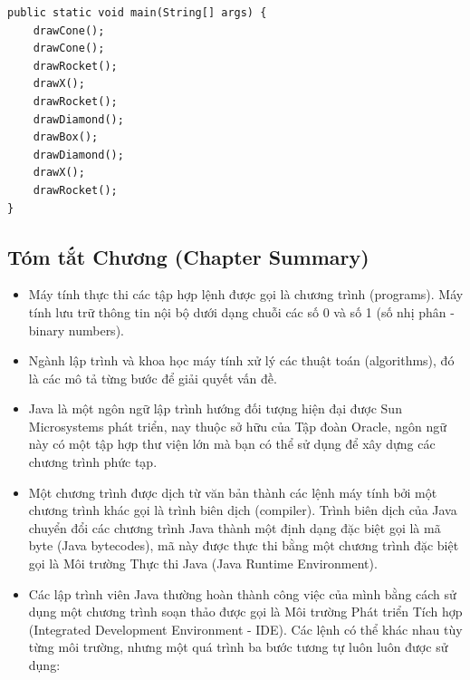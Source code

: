 \begin{verbatim}
public static void main(String[] args) {
    drawCone();
    drawCone();
    drawRocket();
    drawX();
    drawRocket();
    drawDiamond();
    drawBox();
    drawDiamond();
    drawX();
    drawRocket();
}
\end{verbatim}

\subsection{Tóm tắt Chương (Chapter
Summary)}\label{tuxf3m-tux1eaft-chux1b0ux1a1ng-chapter-summary}

\begin{itemize}
\tightlist
\item
  Máy tính thực thi các tập hợp lệnh được gọi là chương trình
  (programs). Máy tính lưu trữ thông tin nội bộ dưới dạng chuỗi các số 0
  và số 1 (số nhị phân - binary numbers).
\item
  Ngành lập trình và khoa học máy tính xử lý các thuật toán
  (algorithms), đó là các mô tả từng bước để giải quyết vấn đề.
\item
  Java là một ngôn ngữ lập trình hướng đối tượng hiện đại được Sun
  Microsystems phát triển, nay thuộc sở hữu của Tập đoàn Oracle, ngôn
  ngữ này có một tập hợp thư viện lớn mà bạn có thể sử dụng để xây dựng
  các chương trình phức tạp.
\item
  Một chương trình được dịch từ văn bản thành các lệnh máy tính bởi một
  chương trình khác gọi là trình biên dịch (compiler). Trình biên dịch
  của Java chuyển đổi các chương trình Java thành một định dạng đặc biệt
  gọi là mã byte (Java bytecodes), mã này được thực thi bằng một chương
  trình đặc biệt gọi là Môi trường Thực thi Java (Java Runtime
  Environment).
\item
  Các lập trình viên Java thường hoàn thành công việc của mình bằng cách
  sử dụng một chương trình soạn thảo được gọi là Môi trường Phát triển
  Tích hợp (Integrated Development Environment - IDE). Các lệnh có thể
  khác nhau tùy từng môi trường, nhưng một quá trình ba bước tương tự
  luôn luôn được sử dụng:


\end{itemize}
